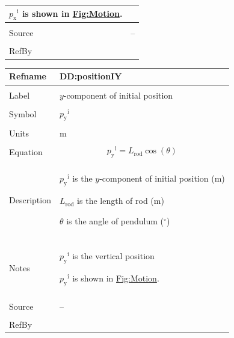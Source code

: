 \documentclass[12pt]{article}
\begin{document}
\begin{minipage}{\textwidth}
\begin{tabular}{>{\raggedright}p{}>{\raggedright\arraybackslash}p{}}
        ${{p_{\text{x}}}^{\text{i}}}$ is shown in \hyperref[Figure:Motion]{Fig:Motion}.
        
\\ \midrule \\
Source & --
         
\\ \midrule \\
RefBy & 
\\ \bottomrule
\end{tabular}
\end{minipage}

\vspace{\baselineskip}
\noindent
\begin{minipage}{\textwidth}
\begin{tabular}{>{\raggedright}p{}>{\raggedright\arraybackslash}p{}}
\toprule \textbf{Refname} & \textbf{DD:positionIY}
\label{DD:positionIY}
\\ \midrule \\
Label & $y$-component of initial position
        
\\ \midrule \\
Symbol & ${{p_{\text{y}}}^{\text{i}}}$
         
\\ \midrule \\
Units & ${\text{m}}$
        
\\ \midrule \\
Equation & \begin{displaymath}
           {{p_{\text{y}}}^{\text{i}}}={L_{\text{rod}}} \cos\left(θ\right)
           \end{displaymath}
\\ \midrule \\
Description & \begin{symbDescription}
              \item{${{p_{\text{y}}}^{\text{i}}}$ is the $y$-component of initial position (${\text{m}}$)}
              \item{${L_{\text{rod}}}$ is the length of rod (${\text{m}}$)}
              \item{$θ$ is the angle of pendulum (${{}^{\circ}}$)}
              \end{symbDescription}
\\ \midrule \\
Notes & ${{p_{\text{y}}}^{\text{i}}}$ is the vertical position
        
        ${{p_{\text{y}}}^{\text{i}}}$ is shown in \hyperref[Figure:Motion]{Fig:Motion}.
        
\\ \midrule \\
Source & --
         
\\ \midrule \\
RefBy & 
\\ \bottomrule
\end{tabular}
\end{minipage}
\end{document}
